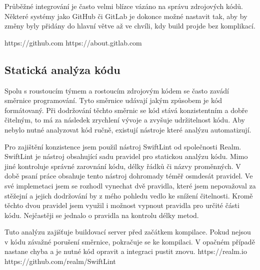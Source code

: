 Průběžné integrování je často velmi blízce vázáno na správu zdrojových kódů.
Některé systémy jako GitHub či GitLab je dokonce možné nastavit tak, aby by změny byly přidány do hlavní větve až ve chvíli, kdy build projde bez komplikací. \cite{travis-ci-build-pr}

https://github.com
https://about.gitlab.com

\subsection{Statická analýza kódu}

Spolu s roustoucím týmem a rostoucím zdrojovým kódem se často zavádí směrnice programování.
Tyto směrnice udávají jakým způsobem je kód formátovaný.
Při dodržování těchto směrnic se kód stává konzistentním a dobře čitelným, to má za následek zrychlení vývoje a zvyšuje udržitelnost kódu.
Aby nebylo nutné analyzovat kód ručně, existují nástroje které analýzu automatizují.

Pro zajištění konzistence jsem použil nástroj SwiftLint od společnosti Realm.
SwiftLint je nástroj obsahující sadu pravidel pro statickou analýzu kódu.
Mimo jiné kontroluje správné zarovnání kódu, délky řádků či názvy proměnných.
V době psaní práce obsahuje tento nástroj dohromady téměř osmdesát pravidel.
Ve své implemetaci jsem se rozhodl vynechat dvě pravidla, které jsem nepovažoval za stěžejní a jejich dodržování by z mého pohledu vedlo ke snížení čitelnosti.
Kromě těchto dvou pravidel jsem využil i možnost vypnout pravidla pro určité části kódu.
Nejčastěji se jednalo o pravidla na kontrolu délky metod.

Tuto analýzu zajišťuje buildovací server před začátkem kompilace.
Pokud nejsou v kódu závažné porušení směrnice, pokračuje se ke kompilaci.
V opačném případě nastane chyba a je nutné kód opravit a integraci pustit znovu.
https://realm.io
https://github.com/realm/SwiftLint
